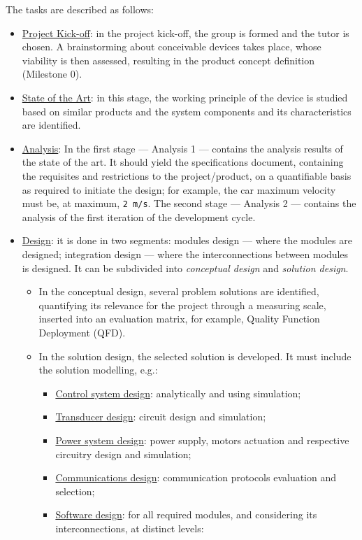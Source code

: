 The tasks are described as follows:
\begin{itemize}
\item \uline{Project Kick-off}: in the project kick-off, the group is formed and the tutor
is chosen. A brainstorming about conceivable devices takes place, whose
viability is then assessed, resulting in the product concept definition
(Milestone 0).
\item \uline{State of the Art}: in this stage, the working principle of the device is
studied based on similar products and the system components and its
characteristics are identified.
\item \uline{Analysis}: In the first stage --- Analysis 1 --- contains the analysis
results of the state of the art. It should yield the specifications document,
containing the requisites and restrictions to the project/product, on a
quantifiable basis as required to initiate the design; for example, the
car maximum velocity must be, at maximum, \texttt{2 m/s}. The second stage --- Analysis 2
--- contains the analysis of the first iteration of the development cycle.
\item \uline{Design}: it is done in two segments: modules design --- where the modules are
designed; integration design --- where the interconnections between modules is
designed. It can be subdivided into \emph{conceptual design} and \emph{solution
design}. 
\begin{itemize}
\item In the conceptual design, several problem solutions are identified,
quantifying its relevance for the project through a measuring scale,
inserted into an evaluation matrix, for example, Quality Function Deployment
(QFD).
\item In the solution design, the selected solution is developed. It must include
the solution modelling, e.g.:
\begin{itemize}
\item \uline{Control system design}: analytically and using simulation;
\item \underline{Transducer design}: circuit design and simulation;
\item \underline{Power system design}: power supply, motors actuation and
  respective circuitry design and simulation;
\item \underline{Communications design}: communication protocols evaluation and selection;
\item \underline{Software design}: for all required modules, and considering its
  interconnections, at distinct levels:

\end{itemize}
\end{itemize}
\end{itemize}
